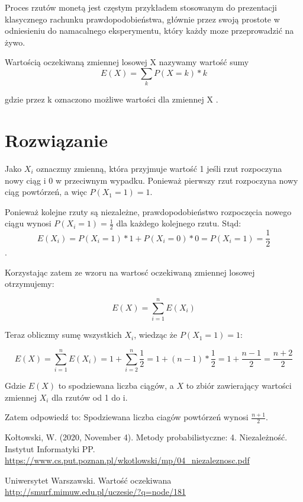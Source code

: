 \documentclass[12pt,oneside,a4paper]{book} %
\theoremstyle{break}
\begin{document}
Proces rzutów monetą jest częstym przykładem stosowanym do prezentacji klasycznego rachunku prawdopodobieństwa, głównie przez swoją prostote w odniesieniu do namacalnego eksperymentu, który każdy moze przeprowadzić na żywo.

Wartością oczekiwaną zmiennej losowej X nazywamy wartość sumy
\[
  E(X)=\sum_{k}P(X=k)*k
\]

gdzie przez k oznaczono możliwe wartości dla zmiennej X \cite{OczekiwanaMIMUW}.




\chapter*{Rozwiązanie}

Jako $X_i$ oznaczmy zmienną, która przyjmuje wartość 1 jeśli rzut rozpoczyna nowy ciąg i 0 w przeciwnym wypadku. Ponieważ pierwszy rzut rozpoczyna nowy ciąg powtórzeń, a więc $P(X_1=1)=1$. 

Ponieważ kolejne rzuty są niezależne, prawdopodobieństwo rozpoczęcia nowego ciągu wynosi $P(X_i=1)=\frac{1}{2}$ dla każdego kolejnego rzutu. Stąd: \[E(X_i)=P(X_i=1)*1+P(X_i=0)*0=P(X_i=1)=\frac{1}{2}\]. 

Korzystając zatem ze wzoru na wartosć oczekiwaną zmiennej losowej otrzymujemy:

\[
  E(X) = \sum_{i=1}^{n}E(X_i)
\]

Teraz obliczmy sumę wszystkich $X_i$, wiedząc że $P(X_1=1)=1$:

\[
  E(X)=\sum_{i=1}^{n}E(X_i) = 1 + \sum_{i=2}^{n}\frac{1}{2} = 1+(n-1)*\frac{1}{2} = 1+ \frac{n-1}{2} = \frac{n+2}{2}
\]

Gdzie $E(X)$ to spodziewana liczba ciągów, a $X$ to zbiór zawierający wartości zmiennej $X_i$ dla rzutów od 1 do i.

Zatem odpowiedź to: Spodziewana liczba ciagów powtórzeń wynosi $\frac{n+1}{2}$.

\begin{thebibliography}{00}
  Kołtowski, W. (2020, November 4). Metody probabilistyczne: 4. Niezależność. Instytut Informatyki PP.\\ \url{https://www.cs.put.poznan.pl/wkotlowski/mp/04\_niezaleznosc.pdf}

  Uniwersytet Warszawski. Wartość oczekiwana\\
  \url{http://smurf.mimuw.edu.pl/uczesie/?q=node/181}

\end{thebibliography}
\end{document}

